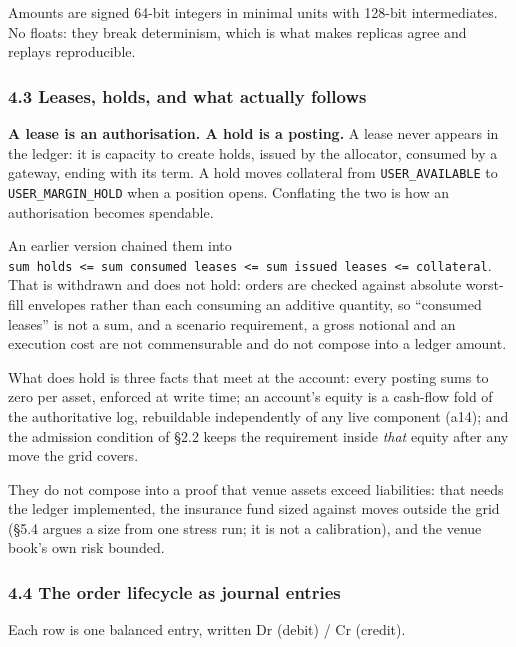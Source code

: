 \documentclass[10pt,a4paper]{article}
\begin{document}
Amounts are signed 64-bit integers in minimal units with 128-bit intermediates.
No floats: they break determinism, which is what makes replicas agree and replays
reproducible.

\subsubsection{4.3 Leases, holds, and what actually follows}\label{leases-holds-and-what-actually-follows}

\textbf{A lease is an authorisation. A hold is a posting.} A lease never appears in
the ledger: it is capacity to create holds, issued by the allocator, consumed by
a gateway, ending with its term. A hold moves collateral from \texttt{USER\_AVAILABLE} to
\texttt{USER\_MARGIN\_HOLD} when a position opens. Conflating the two is how an
authorisation becomes spendable.

An earlier version chained them into
\texttt{sum\ holds\ \textless{}=\ sum\ consumed\ leases\ \textless{}=\ sum\ issued\ leases\ \textless{}=\ collateral}. That is
withdrawn and does not hold: orders are checked against absolute worst-fill
envelopes rather than each consuming an additive quantity, so ``consumed leases''
is not a sum, and a scenario requirement, a gross notional and an execution cost
are not commensurable and do not compose into a ledger amount.

What does hold is three facts that meet at the account: every posting sums to
zero per asset, enforced at write time; an account's equity is a cash-flow fold of
the authoritative log, rebuildable independently of any live component (a14); and
the admission condition of §2.2 keeps the requirement inside \emph{that} equity after any
move the grid covers.

They do not compose into a proof that venue assets exceed liabilities: that needs
the ledger implemented, the insurance fund sized against moves outside the grid
(§5.4 argues a size from one stress run; it is not a calibration), and the venue
book's own risk bounded.

\subsubsection{4.4 The order lifecycle as journal entries}\label{the-order-lifecycle-as-journal-entries}

Each row is one balanced entry, written Dr (debit) / Cr (credit).
\end{document}
